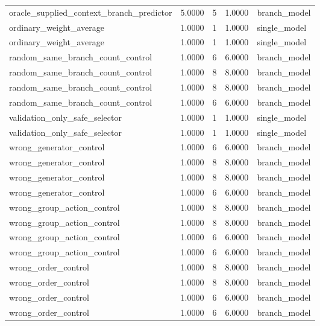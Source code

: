 \begin{tabular}{lllll}
oracle\_supplied\_context\_branch\_predictor & 5.0000 & 5 & 1.0000 & branch\_model\\
ordinary\_weight\_average & 1.0000 & 1 & 1.0000 & single\_model\\
ordinary\_weight\_average & 1.0000 & 1 & 1.0000 & single\_model\\
random\_same\_branch\_count\_control & 1.0000 & 6 & 6.0000 & branch\_model\\
random\_same\_branch\_count\_control & 1.0000 & 8 & 8.0000 & branch\_model\\
random\_same\_branch\_count\_control & 1.0000 & 8 & 8.0000 & branch\_model\\
random\_same\_branch\_count\_control & 1.0000 & 6 & 6.0000 & branch\_model\\
validation\_only\_safe\_selector & 1.0000 & 1 & 1.0000 & single\_model\\
validation\_only\_safe\_selector & 1.0000 & 1 & 1.0000 & single\_model\\
wrong\_generator\_control & 1.0000 & 6 & 6.0000 & branch\_model\\
wrong\_generator\_control & 1.0000 & 8 & 8.0000 & branch\_model\\
wrong\_generator\_control & 1.0000 & 8 & 8.0000 & branch\_model\\
wrong\_generator\_control & 1.0000 & 6 & 6.0000 & branch\_model\\
wrong\_group\_action\_control & 1.0000 & 8 & 8.0000 & branch\_model\\
wrong\_group\_action\_control & 1.0000 & 8 & 8.0000 & branch\_model\\
wrong\_group\_action\_control & 1.0000 & 6 & 6.0000 & branch\_model\\
wrong\_group\_action\_control & 1.0000 & 6 & 6.0000 & branch\_model\\
wrong\_order\_control & 1.0000 & 8 & 8.0000 & branch\_model\\
wrong\_order\_control & 1.0000 & 8 & 8.0000 & branch\_model\\
wrong\_order\_control & 1.0000 & 6 & 6.0000 & branch\_model\\
wrong\_order\_control & 1.0000 & 6 & 6.0000 & branch\_model\\
\bottomrule
\end{tabular}
